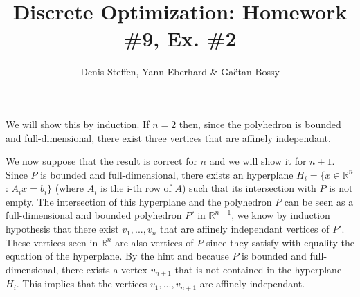 \documentclass[a4paper,11pt,french]{article}
\title{Discrete Optimization: Homework \#9, Ex. \#2}
\author{Denis Steffen, Yann Eberhard \& Gaëtan Bossy}
\begin{document}
    
    \maketitle
    
    We will show this by induction. If $n=2$ then, since the polyhedron is bounded and full-dimensional, there exist three vertices that are affinely independant.
    
    
    We now suppose that the result is correct for $n$ and we will show it for $n+1$.  Since $P$ is bounded and full-dimensional, there exists an hyperplane $H_{i}=\{x \in \mathbb{R}^n$ : $A_i x=b_i \}$ (where $A_i$ is the i-th row of $A$) such that its intersection with $P$ is not empty. The intersection of this hyperplane and the polyhedron $P$ can be seen as a full-dimensional and bounded polyhedron $P'$ in $\mathbb{R}^{n-1}$, we know by induction hypothesis that there exist $v_1,...,v_n$ that are affinely independant vertices of $P'$. These vertices seen in $\mathbb{R}^n$ are also vertices of $P$ since they satisfy with equality the equation of the hyperplane. By the hint and because $P$ is bounded and full-dimensional, there exists a vertex $v_{n+1}$ that is not contained in the hyperplane $H_i$. This implies that the vertices $v_1,...,v_{n+1}$ are affinely independant.

  
\end{document}
